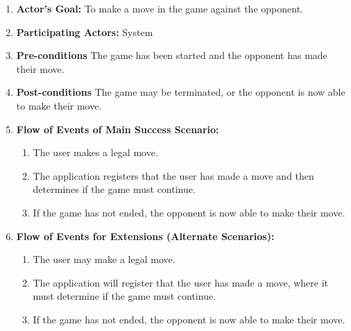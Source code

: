 \documentclass[12pt, titlepage]{article}
\begin{document}
\begin{enumerate}[{UC}1.]
\begin{enumerate}[{ }]
                        \item \textbf{Actor's Goal:} 
                            To make a move in the game against the opponent.
                        
                        \item \textbf{Participating Actors:} 
                            System
                        
                        \item \textbf{Pre-conditions}
                            The game has been started and the opponent has made their move.
                            
                        \item \textbf{Post-conditions}
                            The game may be terminated, or the opponent is now able to make their move.
                            
                        \item \textbf{Flow of Events of Main Success Scenario:}
                           \begin{enumerate}
                                \item The user makes a legal move.
                                \item The application registers that the user has made a move and then determines if the game must continue.
                                \item If the game has not ended, the opponent is now able to make their move.
                            \end{enumerate}
                            
                        \item \textbf{Flow of Events for Extensions (Alternate Scenarios):}
                           \begin{enumerate}
                                \item The user may make a legal move.
                                \item The application will register that the user has made a move, where it must determine if the game must continue.
                                \item If the game has not ended, the opponent is now able to make their move.
                            \end{enumerate}
                    \end{enumerate}
            

\end{enumerate}
\end{document}
